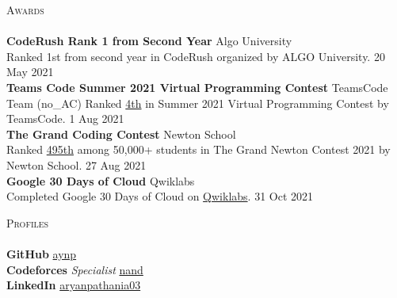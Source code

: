 \documentclass[a4paper]{article}
\newcommand{\lineunder} {
    \vspace*{-8pt} \\
    \hspace*{-18pt} \hrulefill \\
}
\newcommand{\header} [1] {
    {\hspace*{-18pt}\vspace*{6pt} \textsc{#1}}
    \vspace*{-6pt} \lineunder
}
\begin{document}
\header{Awards}
\textbf{CodeRush Rank 1 from Second Year} \hfill Algo University\\
Ranked 1st from second year in CodeRush organized by ALGO University. \hfill 20 May 2021\\
\vspace*{2mm}
\textbf{Teams Code Summer 2021 Virtual Programming Contest} \hfill TeamsCode\\
Team (no\_AC) Ranked \href{https://youtu.be/eCylTCHctY0?t=16137}{4th} in Summer 2021 Virtual Programming Contest by TeamsCode. \hfill 1 Aug 2021\\
\vspace*{2mm}
\textbf{The Grand Coding Contest} \hfill Newton School\\
Ranked \href{https://www.linkedin.com/posts/aryanpathania03_aryan-has-secured-rank-495-in-newtons-grand-activity-6841777869484642304-YhKD}{495th} among 50,000+ students in The Grand Newton Contest 2021 by Newton School. \hfill 27 Aug 2021\\
\vspace*{2mm}
\textbf{Google 30 Days of Cloud} \hfill Qwiklabs\\
Completed Google 30 Days of Cloud on \href{https://www.qwiklabs.com/public_profiles/4c78c6d8-ad43-4991-b8fe-03e559c1bac5}{Qwiklabs}. \hfill 31 Oct 2021\\
\vspace*{2mm}

\header{Profiles}
{\textbf{GitHub}} \hfill \href{https://www.github.com/aynp}{aynp}\\
\vspace*{2mm}
{\textbf{Codeforces}} {\sl Specialist}  \hfill \href{https://codeforces.com/profile/nand}{nand}\\
\vspace*{2mm}
{\textbf{LinkedIn}} \hfill \href{https://www.linkedin.com/in/aryanpathania03/}{aryanpathania03}\\
\
\end{document}
